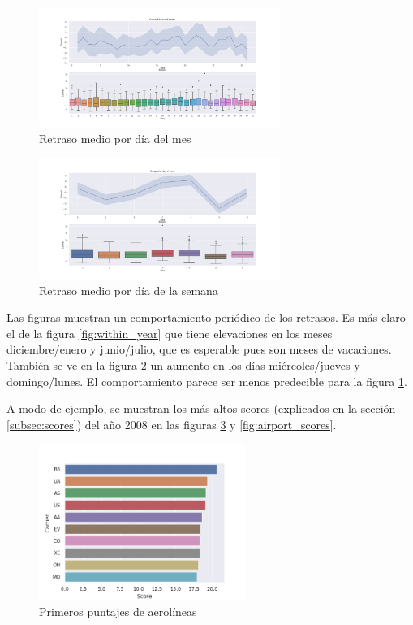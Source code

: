 \begin{figure}[hbtp]
  \centering
  \includegraphics[width=0.7\textwidth]{plots/within_month.png}
  \caption{Retraso medio por d\'ia del mes}
  \label{fig:within_month}
\end{figure}

\begin{figure}[hbtp]
  \centering
  \includegraphics[width=0.7\textwidth]{plots/within_week.png}
  \caption{Retraso medio por d\'ia de la semana}
  \label{fig:within_week}
\end{figure}

Las figuras muestran un comportamiento peri\'odico de los retrasos. Es m\'as claro el de la figura \ref{fig:within_year}
que tiene elevaciones en los meses diciembre/enero y junio/julio, que es esperable pues son
meses de vacaciones. Tambi\'en se ve en la figura \ref{fig:within_week} un aumento en los d\'ias mi\'ercoles/jueves
y domingo/lunes. El comportamiento parece ser menos predecible para la figura \ref{fig:within_month}.

A modo de ejemplo, se muestran los m\'as altos scores
(explicados en la secci\'on \ref{subsec:scores}) del a\~no 2008
en las figuras \ref{fig:carrier_scores} y \ref{fig:airport_scores}.

\begin{figure}[hbtp]
  \centering
  \includegraphics[width=0.6\textwidth, height=2in]{plots/carrier_scores_2008.png}
  \caption{Primeros puntajes de aerol\'ineas}
  \label{fig:carrier_scores}
\end{figure}

